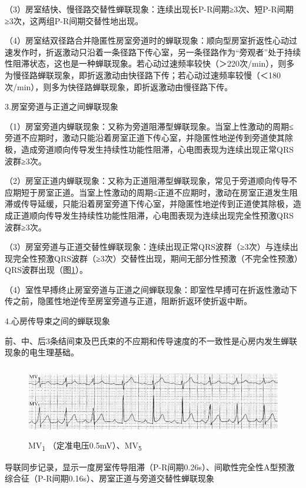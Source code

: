 （3）房室结快、慢径路交替性蝉联现象：连续出现长P-R间期≥3次、短P-R间期≥3次，这两组P-R间期交替性地出现。

（4）房室结双径路合并隐匿性房室旁道时的蝉联现象：顺向型房室折返性心动过速发作时，折返激动只沿着一条径路下传心室，另一条径路作为“旁观者”处于持续性阻滞状态，这也是一种蝉联现象。若心动过速频率较快（＞220次/min），则多为慢径路蝉联现象，即折返激动由快径路下传；若心动过速频率较慢（＜180次/min），则多为快径路蝉联现象，即折返激动由慢径路下传。

3.房室旁道与正道之间蝉联现象

（1）房室旁道内蝉联现象：又称为旁道阻滞型蝉联现象。当室上性激动的周期≤旁道不应期时，激动只能沿着房室正道下传心室，并隐匿性地逆传到旁道使其除极，造成旁道顺向传导发生持续性功能性阻滞，心电图表现为连续出现正常QRS波群≥3次。

（2）房室正道内蝉联现象：又称为正道阻滞型蝉联现象，常见于旁道顺向传导不应期短于房室正道。当室上性激动的周期≤正道不应期时，激动在房室正道发生阻滞或传导延缓，只能沿着房室旁道下传心室，并隐匿性地逆传到正道使其除极，造成正道顺向传导发生持续性功能性阻滞，心电图表现为连续出现完全性预激QRS波群≥3次。

（3）房室旁道与正道交替性蝉联现象：连续出现正常QRS波群（≥3次）与连续出现完全性预激QRS波群（≥3次）交替性出现，期间无部分性预激（不完全性预激）QRS波群出现（图\ref{fig35-8}）。

（4）室性早搏终止房室旁道与正道之间蝉联现象：即室性早搏可在折返性激动下传之前，隐匿性地逆传至房室旁道与正道，阻断折返环使折返中断。

4.心房传导束之间的蝉联现象

前、中、后3条结间束及巴氏束的不应期和传导速度的不一致性是心房内发生蝉联现象的电生理基础。

\begin{figure}[!htbp]
 \centering
 \includegraphics[width=5.5625in,height=1.25in]{./images/Image00561.jpg}
 \captionsetup{justification=centering}
 \caption{MV\textsubscript{1} （定准电压0.5mV）、MV\textsubscript{5}}
 \label{fig35-8}
  \end{figure} 
导联同步记录，显示一度房室传导阻滞（P-R间期0.26s）、间歇性完全性A型预激综合征（P-R间期0.16s）、房室正道与旁道交替性蝉联现象

